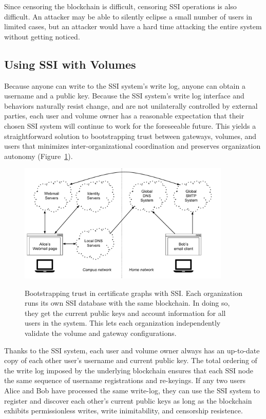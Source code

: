 Since censoring the blockchain is difficult, censoring SSI
operations is also difficult.  An attacker may be able to silently eclipse a small number
of users in limited cases, but an attacker would have a hard time attacking the
entire system without getting noticed.

\subsection{Using SSI with Volumes}

Because anyone can write to the SSI system's write log, anyone can obtain a
username and a public key.  Because the SSI system's write log interface and
behaviors naturally resist change, and are not unilaterally controlled by
external parties, each user and volume owner has a reasonable
expectation that their chosen SSI system will continue to work for the
foreseeable future.  This yields a straightforward solution to bootstrapping
trust between gateways, volumes, and users that minimizes inter-organizational
coordination and preserves organization autonomy 
(Figure~\ref{fig:chap2-ssi-system-with-volumes}).

\begin{figure}[h!]
   \caption{Bootstrapping trust in certificate graphs with SSI.  Each
   organization runs its own SSI database with the same blockchain.  In doing
   so, they get the current public keys and account information for all users in
   the system.  This lets each organization independently validate the volume
   and gateway configurations.}
   \centering
   \includegraphics[width=0.9\textwidth,page=15]{figures/dissertation-figures}
   \label{fig:chap2-ssi-system-with-volumes}
\end{figure}

Thanks to the SSI system, each user and volume owner always has an up-to-date
copy of each other user's username and current public key.  The total ordering
of the write log imposed by the underlying blockchain
ensures that each SSI node the same sequence of
username registrations and re-keyings.  If any two users Alice and Bob have
processed the same write-log, they can use the SSI system to register and
discover each other's current public keys as long as the blockchain exhibits
permissionless writes, write inimitability, and censorship resistence.

